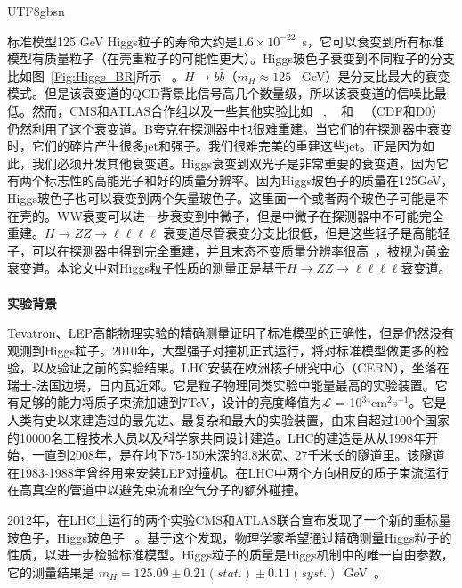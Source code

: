 \begin{CJK}{UTF8}{gbsn}
\par 	标准模型125 GeV Higgs粒子的寿命大约是$1.6\times10^{-22}$~s，它可以衰变到所有标准模型有质量粒子（在壳重粒子的可能性更大）。Higgs玻色子衰变到不同粒子的分支比如图~\ref{Fig:Higgs_BR}所示 ~\cite{Referenceb}。$H\rightarrow b\bar{b}$（$m_H \approx 125$ ~GeV）是分支比最大的衰变模式。但是该衰变道的QCD背景比信号高几个数量级，所以该衰变道的信噪比最低。然而，CMS和ATLAS合作组以及一些其他实验比如 ~\cite{Reference13}, ~\cite{Reference14} 和 ~\cite{Reference15}（CDF和D0）仍然利用了这个衰变道。B夸克在探测器中也很难重建。当它们的在探测器中衰变时，它们的碎片产生很多jet和强子。我们很难完美的重建这些jet。正是因为如此，我们必须开发其他衰变道。Higgs衰变到双光子是非常重要的衰变道，因为它有两个标志性的高能光子和好的质量分辨率。因为Higgs玻色子的质量在125GeV，Higgs玻色子也可以衰变到两个矢量玻色子。这里面一个或者两个玻色子可能是不在壳的。WW衰变可以进一步衰变到中微子，但是中微子在探测器中不可能完全重建。$H \rightarrow ZZ \rightarrow \ell\ell\ell\ell$ 衰变道尽管衰变分支比很低，但是这些轻子是高能轻子，可以在探测器中得到完全重建，并且末态不变质量分辨率很高~\cite{Referenceb}，被视为黄金衰变道。本论文中对Higgs粒子性质的测量正是基于$H \rightarrow ZZ \rightarrow \ell\ell\ell\ell$衰变道。
\\ \\
\textbf{\large{实验背景}} %
\par 	Tevatron、LEP高能物理实验的精确测量证明了标准模型的正确性，但是仍然没有观测到Higgs粒子。2010年，大型强子对撞机正式运行，将对标准模型做更多的检验，以及验证之前的实验结果。LHC安装在欧洲核子研究中心（CERN），坐落在瑞士-法国边境，日内瓦近郊。它是粒子物理同类实验中能量最高的实验装置。它有足够的能力将质子束流加速到7TeV，设计的亮度峰值为$\mathscr{L}$ = 10$^{34}$cm$^{2}$s$^{-1}$。它是人类有史以来建造过的最先进、最复杂和最大的实验装置，由来自超过100个国家的10000名工程技术人员以及科学家共同设计建造。LHC的建造是从从1998年开始，一直到2008年，是在地下75-150米深的3.8米宽、27千米长的隧道里。该隧道在1983-1988年曾经用来安装LEP对撞机。在LHC中两个方向相反的质子束流运行在高真空的管道中以避免束流和空气分子的额外碰撞。
\par 	2012年，在LHC上运行的两个实验CMS和ATLAS联合宣布发现了一个新的重标量玻色子，Higgs玻色子 ~\cite{Reference20,Reference21}。基于这个发现，物理学家希望通过精确测量Higgs粒子的性质，以进一步检验标准模型。Higgs粒子的质量是Higgs机制中的唯一自由参数，它的测量结果是 $m_H = 125.09\pm 0.21(stat.)\pm0.11(syst.)$~GeV~\cite{Reference22}。 

\end{CJK}
